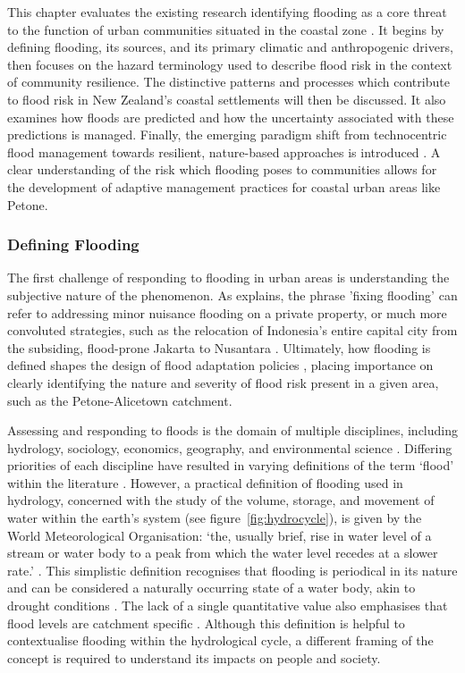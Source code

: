 This chapter evaluates the existing research identifying flooding as a core
threat to the function of urban communities situated in the coastal zone
\parencite{Fu2023, kool2020, Pennington2025, Schneider2020, White2013}. It
begins by defining flooding, its sources, and its primary climatic and
anthropogenic drivers, then focuses on the hazard terminology used to describe
flood risk in the context of community resilience. The distinctive patterns and
processes which contribute to flood risk in New Zealand’s coastal settlements
will then be discussed. It also examines how floods are predicted and how the
uncertainty associated with these predictions is managed. Finally, the emerging
paradigm shift from technocentric flood management towards resilient,
nature-based approaches is introduced \parencite{White2013}. A clear
understanding of the risk which flooding poses to communities allows for the
development of adaptive management practices for coastal urban areas like
Petone.

\subsubsection{Defining Flooding}
The first challenge of responding to flooding in urban areas is understanding
the subjective nature of the phenomenon. As \textcite{Pennington2025} explains,
the phrase 'fixing flooding' can refer to addressing minor nuisance flooding on
a private property, or much more convoluted strategies, such as the relocation
of Indonesia’s entire capital city from the subsiding, flood-prone Jakarta to
Nusantara \parencite{Perwira2024}. Ultimately, how flooding is defined shapes
the design of flood adaptation policies \parencite{Schneider2020}, placing
importance on clearly identifying the nature and severity of flood risk present
in a given area, such as the Petone-Alicetown catchment.

Assessing and responding to floods is the domain of multiple disciplines,
including hydrology, sociology, economics, geography, and environmental science
\parencite{Solin2013}. Differing priorities of each discipline have resulted in
varying definitions of the term ‘flood’ within the literature \parencite{Fu2023,
Pennington2025, Ward1978, White2013, WMO2011}. However, a practical definition
of flooding used in hydrology, concerned with the study of the volume, storage,
and movement of water within the earth’s system \parencite{Salas2014} (see
figure~\ref{fig:hydrocycle}), is given by the World Meteorological Organisation:
‘the, usually brief, rise in water level of a stream or water body to a peak
from which the water level recedes at a slower rate.’ \parencite{WMO2011}. This
simplistic definition recognises that flooding is periodical in its nature and
can be considered a naturally occurring state of a water body, akin to drought
conditions \parencite{White2013}. The lack of a single quantitative value also
emphasises that flood levels are catchment specific \parencite{Pennington2025}.
Although this definition is helpful to contextualise flooding within the
hydrological cycle, a different framing of the concept is required to understand
its impacts on people and society.

